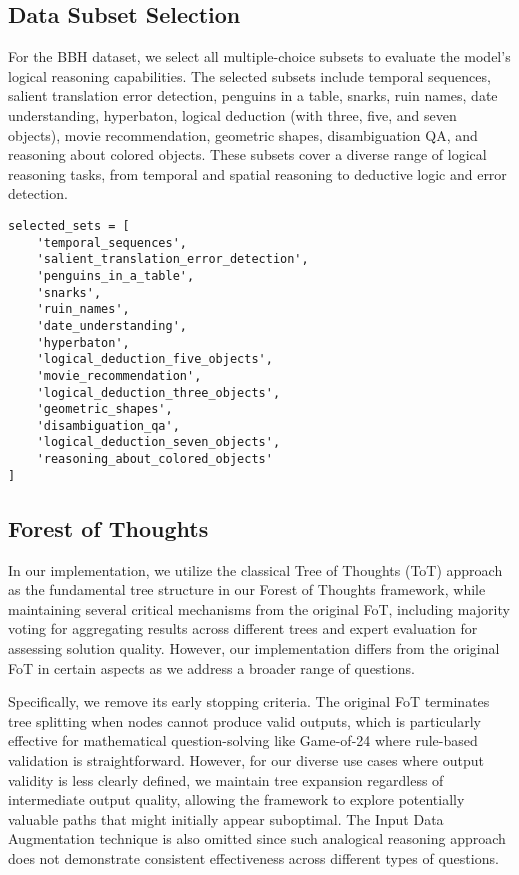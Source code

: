 \subsection{Data Subset Selection}
\label{appendix:data}
For the BBH dataset, we select all multiple-choice subsets to evaluate the model's logical reasoning capabilities. The selected subsets include temporal sequences, salient translation error detection, penguins in a table, snarks, ruin names, date understanding, hyperbaton, logical deduction (with three, five, and seven objects), movie recommendation, geometric shapes, disambiguation QA, and reasoning about colored objects. These subsets cover a diverse range of logical reasoning tasks, from temporal and spatial reasoning to deductive logic and error detection.

\begin{lstlisting}[style=PythonStyle, caption={BBH Subset Selection}]
selected_sets = [
    'temporal_sequences',
    'salient_translation_error_detection',
    'penguins_in_a_table',
    'snarks',
    'ruin_names',
    'date_understanding',
    'hyperbaton',
    'logical_deduction_five_objects',
    'movie_recommendation',
    'logical_deduction_three_objects',
    'geometric_shapes',
    'disambiguation_qa',
    'logical_deduction_seven_objects',
    'reasoning_about_colored_objects'
]
\end{lstlisting}

\subsection{Forest of Thoughts}
In our implementation, we utilize the classical Tree of Thoughts (ToT) approach as the fundamental tree structure in our Forest of Thoughts framework, while maintaining several critical mechanisms from the original FoT, including majority voting for aggregating results across different trees and expert evaluation for assessing solution quality. However, our implementation differs from the original FoT in certain aspects as we address a broader range of questions. 

Specifically, we remove its early stopping criteria. The original FoT terminates tree splitting when nodes cannot produce valid outputs, which is particularly effective for mathematical question-solving like Game-of-24 where rule-based validation is straightforward. However, for our diverse use cases where output validity is less clearly defined, we maintain tree expansion regardless of intermediate output quality, allowing the framework to explore potentially valuable paths that might initially appear suboptimal. The Input Data Augmentation technique is also omitted since such analogical reasoning approach does not demonstrate consistent effectiveness across different types of questions.

